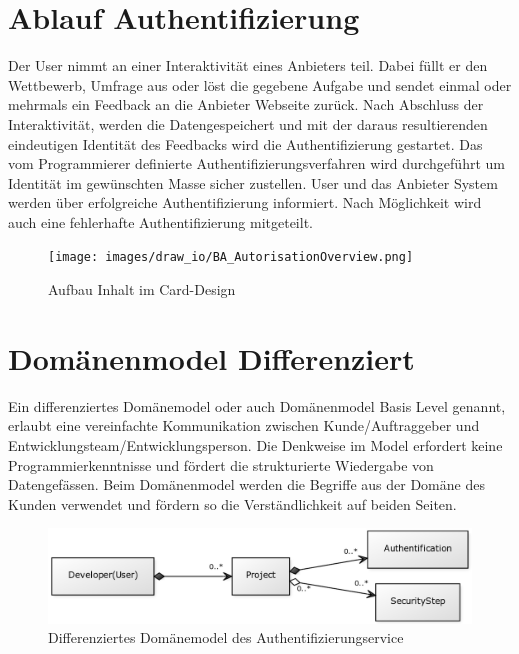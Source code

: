 \subsection{}\label{section}

\newpage

\section{Ablauf Authentifizierung}\label{ablauf-authentifizierung}

Der User nimmt an einer Interaktivität eines Anbieters teil. Dabei füllt
er den Wettbewerb, Umfrage aus oder löst die gegebene Aufgabe und sendet
einmal oder mehrmals ein Feedback an die Anbieter Webseite zurück. Nach
Abschluss der Interaktivität, werden die Datengespeichert und mit der
daraus resultierenden eindeutigen Identität des Feedbacks wird die
Authentifizierung gestartet. Das vom Programmierer definierte
Authentifizierungsverfahren wird durchgeführt um Identität im
gewünschten Masse sicher zustellen. User und das Anbieter System werden
über erfolgreiche Authentifizierung informiert. Nach Möglichkeit wird
auch eine fehlerhafte Authentifizierung mitgeteilt.

\begin{figure}[htbp]
\centering
\texttt{[image: images/draw\_io/BA\_AutorisationOverview.png]}
\caption{Aufbau Inhalt im Card-Design}
\end{figure}

\section{Domänenmodel
Differenziert}\label{domuxe4nenmodel-differenziert}

Ein differenziertes Domänemodel oder auch Domänenmodel Basis Level
genannt, erlaubt eine vereinfachte Kommunikation zwischen
Kunde/Auftraggeber und Entwicklungsteam/Entwicklungsperson. Die
Denkweise im Model erfordert keine Programmierkenntnisse und fördert die
strukturierte Wiedergabe von Datengefässen. Beim Domänenmodel werden die
Begriffe aus der Domäne des Kunden verwendet und fördern so die
Verständlichkeit auf beiden Seiten.

\begin{figure}[htbp]
\centering
\includegraphics{images/domaenenmodell.png}
\caption{Differenziertes Domänemodel des Authentifizierungservice}
\end{figure}

